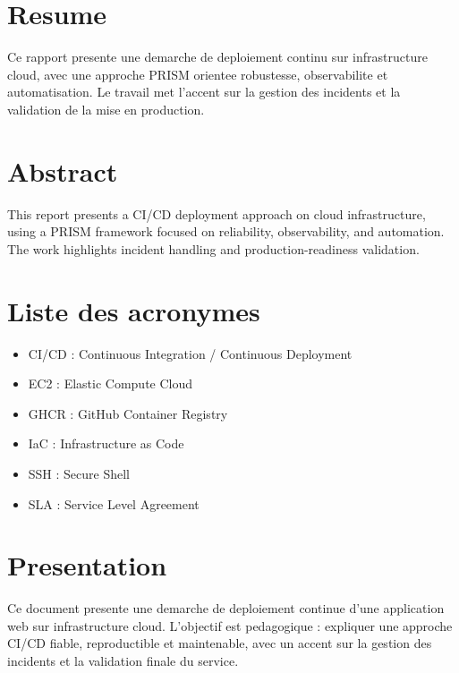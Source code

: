 \documentclass[12pt,a4paper]{report}
\begin{document}
\chapter*{Resume}
Ce rapport presente une demarche de deploiement continu sur infrastructure cloud,
avec une approche PRISM orientee robustesse, observabilite et automatisation.
Le travail met l'accent sur la gestion des incidents et la validation de la mise en production.

\chapter*{Abstract}
This report presents a CI/CD deployment approach on cloud infrastructure,
using a PRISM framework focused on reliability, observability, and automation.
The work highlights incident handling and production-readiness validation.

\tableofcontents
\listoffigures
\listoftables
\clearpage

\chapter*{Liste des acronymes}
\begin{itemize}
  \item CI/CD : Continuous Integration / Continuous Deployment
  \item EC2 : Elastic Compute Cloud
  \item GHCR : GitHub Container Registry
  \item IaC : Infrastructure as Code
  \item SSH : Secure Shell
  \item SLA : Service Level Agreement
\end{itemize}

\chapter*{Presentation}
Ce document presente une demarche de deploiement continue d'une application web sur infrastructure cloud.
L'objectif est pedagogique : expliquer une approche CI/CD fiable, reproductible et maintenable,
avec un accent sur la gestion des incidents et la validation finale du service.
\end{document}
